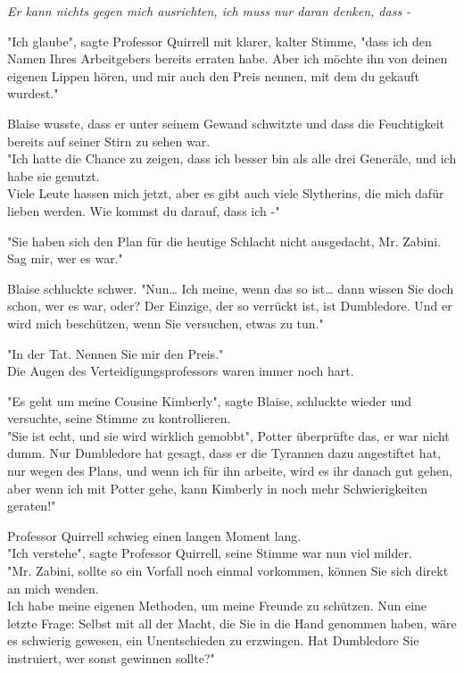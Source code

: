 {\emph{Er kann nichts gegen mich ausrichten, ich muss nur daran denken, dass -}

"Ich glaube", sagte Professor Quirrell mit klarer, kalter Stimme, "dass ich den Namen Ihres Arbeitgebers bereits erraten habe. Aber ich möchte ihn von deinen eigenen Lippen hören, und mir auch den Preis nennen, mit dem du gekauft wurdest."

Blaise wusste, dass er unter seinem Gewand schwitzte und dass die Feuchtigkeit bereits auf seiner Stirn zu sehen war.\\ "Ich hatte die Chance zu zeigen, dass ich besser bin als alle drei Generäle, und ich habe sie genutzt.\\ Viele Leute hassen mich jetzt, aber es gibt auch viele Slytherins, die mich dafür lieben werden. Wie kommst du darauf, dass ich -"

"Sie haben sich den Plan für die heutige Schlacht nicht ausgedacht, Mr. Zabini. Sag mir, wer es war."

Blaise schluckte schwer. "Nun… Ich meine, wenn das so ist… dann wissen Sie doch schon, wer es war, oder? Der Einzige, der so verrückt ist, ist Dumbledore. Und er wird mich beschützen, wenn Sie versuchen, etwas zu tun."

"In der Tat. Nennen Sie mir den Preis."\\ Die Augen des Verteidigungsprofessors waren immer noch hart.

"Es geht um meine Cousine Kimberly", sagte Blaise, schluckte wieder und versuchte, seine Stimme zu kontrollieren.\\ "Sie ist echt, und sie wird wirklich gemobbt", Potter überprüfte das, er war nicht dumm. Nur Dumbledore hat gesagt, dass er die Tyrannen dazu angestiftet hat, nur wegen des Plans, und wenn ich für ihn arbeite, wird es ihr danach gut gehen, aber wenn ich mit Potter gehe, kann Kimberly in noch mehr Schwierigkeiten geraten!"

Professor Quirrell schwieg einen langen Moment lang.\\ "Ich verstehe", sagte Professor Quirrell, seine Stimme war nun viel milder.\\ "Mr. Zabini, sollte so ein Vorfall noch einmal vorkommen, können Sie sich direkt an mich wenden.\\ Ich habe meine eigenen Methoden, um meine Freunde zu schützen. Nun eine letzte Frage: Selbst mit all der Macht, die Sie in die Hand genommen haben, wäre es schwierig gewesen, ein Unentschieden zu erzwingen. Hat Dumbledore Sie instruiert, wer sonst gewinnen sollte?"

}
